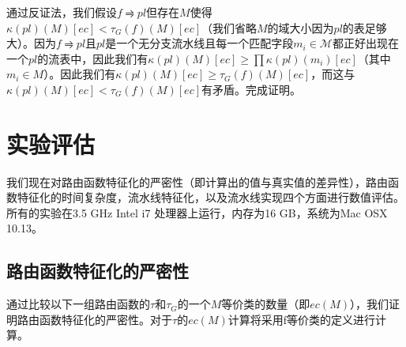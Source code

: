 \documentclass{ctexart}
\begin{document}
通过反证法，我们假设$f \rightrightharpoons pl$但存在$M$使得$\kappa(pl)(M)[ec] < \tau_G(f)(M)[ec]$（我们省略$M$的域大小因为$pl$的表足够大）。因为$f \rightrightharpoons pl$且$pl$是一个无分支流水线且每一个匹配字段$m_i \in \mathcal{M}$都正好出现在一个$pl$的流表中，因此我们有$\kappa(pl)(M)[ec] \ge \prod \kappa(pl)(m_i)[ec]$（其中$m_i \in M$）。因此我们有$\kappa(pl)(M)[ec] \ge \tau_G(f)(M)[ec]$，而这与$\kappa(pl)(M)[ec] < \tau_G(f)(M)[ec]$有矛盾。完成证明。




\section{实验评估}

我们现在对路由函数特征化的严密性（即计算出的值与真实值的差异性），路由函数特征化的时间复杂度，流水线特征化，以及流水线实现四个方面进行数值评估。所有的实验在3.5 GHz Intel i7 处理器上运行，内存为16 GB，系统为Mac OSX 10.13。


\subsection{路由函数特征化的严密性}
\label{sec:eval1}

通过比较以下一组路由函数的$\tau$和$\tau_G$的一个$M$等价类的数量（即$ec(M)$），我们证明路由函数特征化的严密性。对于$\tau$的$ec(M)$计算将采用f等价类的定义进行计算。

\end{document}
